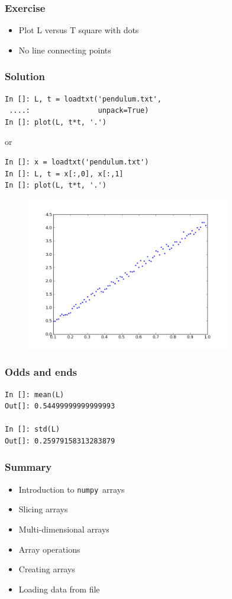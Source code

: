 \documentclass[14pt,compress]{beamer}
\newcounter{time}
\newcommand{\inctime}[1]{\addtocounter{time}{#1}{\tiny \thetime\ m}}
\newcommand{\num}{\texttt{numpy}}
\begin{document}
\begin{frame}[fragile]
  \frametitle{Exercise}
  \begin{itemize}
  \item Plot L versus T square with dots
  \item No line connecting points
  \end{itemize}
  \inctime{10}
\end{frame}

\begin{frame}[fragile]
\frametitle{Solution}
\begin{lstlisting}
In []: L, t = loadtxt('pendulum.txt',
 ....:                unpack=True)
In []: plot(L, t*t, '.')
\end{lstlisting}
or
\begin{lstlisting}
In []: x = loadtxt('pendulum.txt')
In []: L, t = x[:,0], x[:,1]
In []: plot(L, t*t, '.')
\end{lstlisting}

\end{frame}


\begin{frame}[fragile]
\begin{figure}
\includegraphics[width=3.5in]{data/L-Tsq.png}
\end{figure}
\end{frame}

\begin{frame}[fragile]
\frametitle{Odds and ends}
\begin{lstlisting}
In []: mean(L)
Out[]: 0.54499999999999993

In []: std(L)
Out[]: 0.25979158313283879
\end{lstlisting}
\end{frame}

\begin{frame}[fragile]
\frametitle{Summary}
\begin{itemize}
\item Introduction to \num\ arrays
\item Slicing arrays
\item Multi-dimensional arrays
\item Array operations
\item Creating arrays
\item Loading data from file
\end{itemize}

\inctime{5}
\end{frame}
\end{document}
